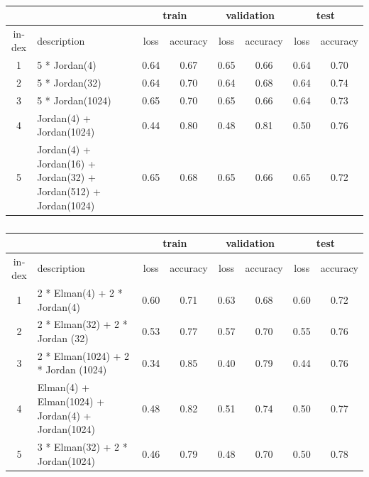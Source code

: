 \documentclass[12pt, a4paper]{article}
\begin{document}
\begin{latin}
\begin{table}[h]
    \centering
    \caption{}
    \label{pure_jordan_performance_different_dataset}
    \begin{tabular}{c|p{3cm}|c|c|c|c|c|c}
        & & \multicolumn{2}{c|}{\cellcolor{teal!30}train} & \multicolumn{2}{c|}{\cellcolor{teal!30}validation} &  \multicolumn{2}{c}{\cellcolor{teal!30}test} \\ \hline
        index & description & loss & accuracy & loss & accuracy & loss & accuracy\\ \hline
        1 & 5 * Jordan(4) & 0.64 & 0.67 & 0.65 & 0.66 & 0.64 & 0.70 \\
        2 & 5 * Jordan(32) & 0.64 & 0.70 & 0.64 & 0.68 & 0.64 & 0.74 \\
        3 & 5 * Jordan(1024) & 0.65 & 0.70 & 0.65 & 0.66 & 0.64 & 0.73 \\
        4 & Jordan(4) + Jordan(1024) & 0.44 & 0.80 & 0.48 & 0.81 & 0.50 & 0.76 \\
        5 & Jordan(4) + Jordan(16) + Jordan(32) + Jordan(512) + Jordan(1024) & 0.65 & 0.68 & 0.65 & 0.66 & 0.65 & 0.72 \\
    \end{tabular}
\end{table}
\end{latin}

\clearpage

\begin{latin}
\begin{table}[h]
    \centering
    \caption{}
    \label{elman_jordan_performance_different_dataset}
    \begin{tabular}{c|p{3cm}|c|c|c|c|c|c}
        & & \multicolumn{2}{c|}{\cellcolor{teal!30}train} & \multicolumn{2}{c|}{\cellcolor{teal!30}validation} &  \multicolumn{2}{c}{\cellcolor{teal!30}test} \\ \hline
        index & description & loss & accuracy & loss & accuracy & loss & accuracy\\ \hline
        1 & 2 * Elman(4) + 2 * Jordan(4) & 0.60 & 0.71 & 0.63 & 0.68 & 0.60 & 0.72 \\
        2 & 2 * Elman(32) + 2 * Jordan (32) & 0.53 & 0.77 & 0.57 & 0.70 & 0.55 & 0.76 \\
        3 & 2 * Elman(1024) + 2 * Jordan (1024) & 0.34 & 0.85 & 0.40 & 0.79 & 0.44 & 0.76 \\
        4 & Elman(4) + Elman(1024) + Jordan(4) + Jordan(1024) & 0.48 & 0.82 & 0.51 & 0.74 & 0.50 & 0.77 \\
        5 & 3 * Elman(32) + 2 * Jordan(1024) & 0.46 & 0.79 & 0.48 & 0.70 & 0.50 & 0.78
    \end{tabular}
\end{table}
\end{latin}
\end{document}
